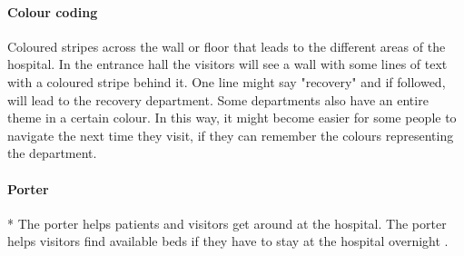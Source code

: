 \paragraph{Colour coding}
Coloured stripes across the wall or floor that leads to the different areas of the hospital. In the entrance hall the visitors will see a wall with some lines of text with a coloured stripe behind it. One line might say "recovery" and if followed, will lead to the recovery department. Some departments also have an entire theme in a certain colour. In this way, it might become easier for some people to navigate the next time they visit, if they can remember the colours representing the department. 

\paragraph{Porter}*
The porter helps patients and visitors get around at the hospital. The porter helps visitors find available beds if they have to stay at the hospital overnight \cite{ugd_port}. 

